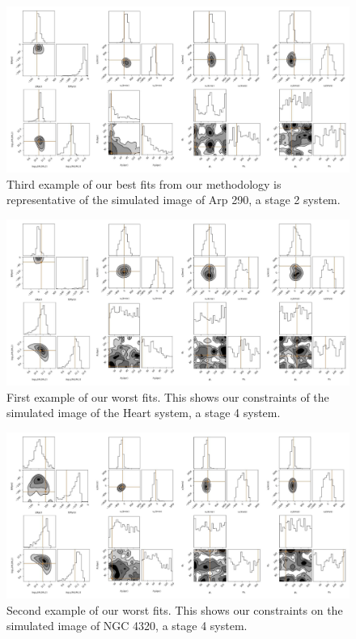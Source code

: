 \begin{figure}
    \centering
    \includegraphics[width=\textwidth]{Chapter1/figures/Arp290-red-corner.pdf}
    \caption{Third example of our best fits from our methodology is representative of the simulated image of Arp 290, a stage 2 system.}
    \label{fig:best-Arp290}
\end{figure}

\begin{figure}
    \centering
    \includegraphics[width=\textwidth]{Chapter1/figures/Heart-red-corner.pdf}
    \caption{First example of our worst fits. This shows our constraints of the simulated image of the Heart system, a stage 4 system.}
    \label{fig:worst-Heart}
\end{figure}

\begin{figure}
    \centering
    \includegraphics[width=\textwidth]{Chapter1/figures/Arp57-red-corner.pdf}
    \caption{Second example of our worst fits. This shows our constraints on the simulated image of NGC 4320, a stage 4 system.}
    \label{fig:worst-Arp57}
\end{figure}

